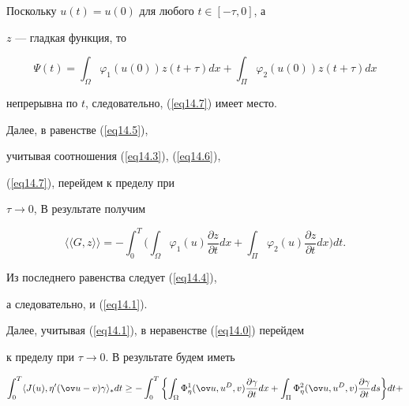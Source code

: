 \begin{pf}
\begin{equation}
\end{equation}


Поскольку $u(t)=u(0)$ для любого $t \in [-\tau, 0]$, а


$z$ --- гладкая функция, то


$$


\Psi(t)=


\int_{\Omega} \varphi_{1}(u(0)) z(t+\tau) dx+


\int_{\Pi} \varphi_{2}(u(0)) z(t+\tau) dx


$$


непрерывна по $t$, следовательно, (\ref{eq14.7}) имеет место.





Далее, в равенстве (\ref{eq14.5}), 


учитывая соотношения (\ref{eq14.3}), (\ref{eq14.6}),


(\ref{eq14.7}), перейдем к пределу при


$\tau \to 0$, В результате получим


$$


\langle \langle G, z \rangle \rangle=- \int_{0}^{T} \bigg (


\int_{\Omega} \varphi_{1}(u) \frac{\partial z}{\partial t} dx+


\int_{\Pi} \varphi_{2}(u) \frac{\partial z}{\partial t} dx 


\bigg) dt.


$$


Из последнего равенства следует (\ref{eq14.4}), 


а следовательно, и (\ref{eq14.1}). 





Далее, учитывая (\ref{eq14.1}), в неравенстве (\ref{eq14.0}) перейдем


к пределу при $\tau \rightarrow 0$. В результате будем иметь


\begin{multline} 


\label{eq15} 


\int_{0}^{T} \langle J(u),{\eta}' (\ov u-v) \gamma \rangle_{*} dt \geq 


- \int_{0}^{T} \bigg\{{ \int_{\Omega} \Phi_{\eta}^{1} (\ov u, u^{D}, v)


\frac{\partial \gamma}{\partial t} dx+


\int_{\Pi} \Phi_{\eta}^{2} (\ov u, u^{D}, v)


\frac{\partial \gamma}{\partial t} ds} \bigg \} dt+\\



\end{multline}
\end{pf}
